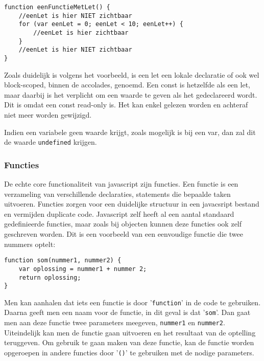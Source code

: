 \begin{lstlisting}[frame=single, caption=Een functie met let]
function eenFunctieMetLet() {
	//eenLet is hier NIET zichtbaar
	for (var eenLet = 0; eenLet < 10; eenLet++) {
		//eenLet is hier zichtbaar
	}
	//eenLet is hier NIET zichtbaar
}
\end{lstlisting}

Zoals duidelijk is volgens het voorbeeld, is een let een lokale declaratie of ook wel block-scoped, binnen de accolades, genoemd. Een const is hetzelfde als een let, maar daarbij is het verplicht om een waarde te geven als het gedeclareerd wordt. Dit is omdat een const read-only is. Het kan enkel gelezen worden en achteraf niet meer worden gewijzigd.

Indien een variabele geen waarde krijgt, zoals mogelijk is bij een var, dan zal dit de waarde \lstinline[basicstyle=\ttfamily\color{red}]|undefined| krijgen.

\subsubsection{Functies}
\label{sssec:functies}
De echte core functionaliteit van javascript zijn functies. Een functie is een verzameling van verschillende declaraties, statements die bepaalde taken uitvoeren. Functies zorgen voor een duidelijke structuur in een javacsript bestand en vermijden duplicate code. Javascript zelf heeft al een aantal standaard gedefinieerde functies, maar zoals bij objecten kunnen deze functies ook zelf geschreven worden. Dit is een voorbeeld van een eenvoudige functie die twee nummers optelt:

\begin{lstlisting}[frame=single, caption=Een functie die twee getallen optelt]
function som(nummer1, nummer2) {
	var oplossing = nummer1 + nummer 2;
	return oplossing;
}
\end{lstlisting}

Men kan aanhalen dat iets een functie is door '\lstinline[basicstyle=\ttfamily\color{red}]|function|' in de code te gebruiken. Daarna geeft men een naam voor de functie, in dit geval is dat '\lstinline[basicstyle=\ttfamily\color{red}]|som|'. Dan gaat men aan deze functie twee parameters meegeven, \lstinline[basicstyle=\ttfamily\color{red}]|nummer1| en \lstinline[basicstyle=\ttfamily\color{red}]|nummer2|. Uiteindelijk kan men de functie gaan uitvoeren en het resultaat van de optelling teruggeven. Om gebruik te gaan maken van deze functie, kan de functie worden opgeroepen in andere functies door '\lstinline[basicstyle=\ttfamily\color{red}]|()|' te gebruiken met de nodige parameters.


